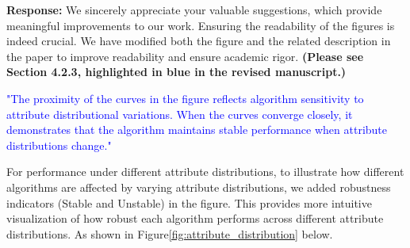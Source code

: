 \documentclass[sigconf, nonacm]{acmart}
\begin{document}
\noindent
\textbf{Response:} We sincerely appreciate your valuable suggestions, which provide meaningful improvements to our work. Ensuring the readability of the figures is indeed crucial. We have modified both the figure and the related description in the paper to improve readability and ensure academic rigor. \textbf{(Please see Section 4.2.3, highlighted in blue in the revised manuscript.)}

\textcolor{blue}{"The proximity of the curves in the figure reflects algorithm sensitivity to attribute distributional variations. When the curves converge closely, it demonstrates that the algorithm maintains stable performance when attribute distributions change."}

For performance under different attribute distributions, to illustrate how different algorithms are affected by varying attribute distributions, we added robustness indicators (Stable and Unstable) in the figure. This provides more intuitive visualization of how robust each algorithm performs across different attribute distributions. As shown in Figure\ref{fig:attribute_distribution} below.
%
%
%
\end{document}
